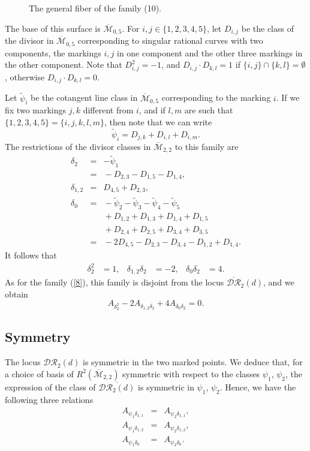 \documentclass[10pt]{amsart}
\theoremstyle{definition}
\begin{document}
{\begin{enumerate}
\begin{figure}[htbp]
\centering
  
  

  \caption{The general fiber of the family (10).}
\end{figure}

The base of this surface is ${\overline{\mathcal{M}}}_{0,5}$. 
For $i,j\in\{1,2,3,4,5\}$, let $D_{i,j}$ be the class of the divisor in ${\overline{\mathcal{M}}}_{0,5}$ corresponding to singular rational curves with two components, the markings $i,j$ in one component and the other three markings in the other component. Note that $D_{i,j}^2=-1$, and $D_{i,j}\cdot D_{k,l}=1$ if $\{i,j\}\cap\{k,l\}=\emptyset$, otherwise $D_{i,j}\cdot D_{k,l}=0$.

Let $\widetilde{\psi}_i$ be the cotangent line class in ${\overline{\mathcal{M}}}_{0,5}$ corresponding to the marking $i$. If we fix two markings $j,k$ different from $i$, and if $l,m$ are such that $\{1,2,3,4,5\}=\{i,j,k,l,m\}$, then note that we can write
\[
 \widetilde{\psi}_i = D_{j,k}+D_{i,l}+D_{i,m}.
\]
The restrictions of the divisor classes in ${\overline{\mathcal{M}}}_{2,2}$ to this family are
\begin{eqnarray*}
 \delta_2 &=& -\widetilde{\psi}_1\\
	&=& {}-D_{2,3}-D_{1,5}-D_{1,4},\\
 \delta_{1,2} &=& D_{4,5}+D_{2,3},\\
 \delta_0 &=& {}-\widetilde{\psi}_2-\widetilde{\psi}_3-\widetilde{\psi}_4-\widetilde{\psi}_5\\
&& {}+D_{1,2}+D_{1,3}+D_{1,4}+D_{1,5}\\
&& {}+D_{2,4}+D_{2,5}+D_{3,4}+D_{3,5}\\
&=& {}-2D_{4,5}-D_{2,3}-D_{3,4}-D_{1,2}+D_{1,4}.
\end{eqnarray*}
It follows that
\begin{align*}
\delta_2^2 &=1, & \delta_{1,2}\delta_2 &= -2, & \delta_0\delta_2 &= 4.
\end{align*}
As for the family (\ref{8}), this family is disjoint from the locus $\overline{\mathcal{DR}}_2(d)$, and we obtain
\[
 A_{\delta_2^2}-2A_{\delta_{1,2}\delta_2}+4A_{\delta_0\delta_2}=0.
\]

\end{enumerate} }

\subsection{Symmetry}
\label{symmetry} 
The locus $\mathcal{DR}_2(d)$ is symmetric in the two marked points. We deduce that, for a choice of basis of $R^2({\overline{\mathcal{M}}}_{2,2})$ symmetric with respect to the classes $\psi_1$, $\psi_2$, the expression of the class of $\overline{\mathcal{DR}_2(d)}$ is symmetric in $\psi_1$, $\psi_2$. Hence, we have the following three relations
\begin{eqnarray*}
A_{\psi_1\delta_{1,1}}&=&A_{\psi_2\delta_{1,1}},\\
A_{\psi_1\delta_{1,2}}&=&A_{\psi_2\delta_{1,2}},\\
A_{\psi_1\delta_{0}}&=&A_{\psi_2\delta_{0}}.
\end{eqnarray*}
\end{document}
